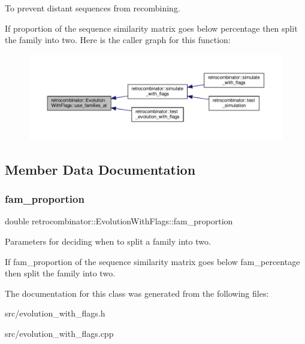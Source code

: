 To prevent distant sequences from recombining. 

If {\ttfamily proportion} of the sequence similarity matrix goes below {\ttfamily percentage} then split the family into two. Here is the caller graph for this function\+:
\nopagebreak
\begin{figure}[H]
\begin{center}
\leavevmode
\includegraphics[width=350pt]{classretrocombinator_1_1EvolutionWithFlags_ad94cabcb6a894d503c3d84c6022a1438_icgraph}
\end{center}
\end{figure}


\subsection{Member Data Documentation}
\mbox{\label{classretrocombinator_1_1EvolutionWithFlags_a6bd3b124459c847b387b5d083abf0a98}} 
\subsubsection{\texorpdfstring{fam\+\_\+proportion}{fam\_proportion}}
{\footnotesize\ttfamily double retrocombinator\+::\+Evolution\+With\+Flags\+::fam\+\_\+proportion\hspace{0.3cm}{\ttfamily [protected]}}



Parameters for deciding when to split a family into two. 

If {\ttfamily fam\+\_\+proportion} of the sequence similarity matrix goes below {\ttfamily fam\+\_\+percentage} then split the family into two. 

The documentation for this class was generated from the following files\+:\begin{DoxyCompactItemize}
\item 
src/evolution\+\_\+with\+\_\+flags.\+h\item 
src/evolution\+\_\+with\+\_\+flags.\+cpp\end{DoxyCompactItemize}
